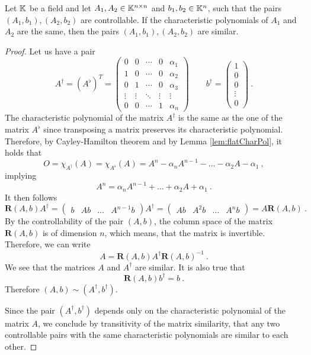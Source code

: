 \begin{lemma}
\label{lem:simCont}
    Let $\mathbb{K}$ be a field and let $A_1,A_2\in\mathbb{K}^{n\times n}$ and $b_1,b_2\in\mathbb{K}^n$, such that the pairs $(A_1,b_1),(A_2,b_2)$ are controllable. If the characteristic polynomials of $A_1$ and $A_2$ are the same, then the pairs $(A_1,b_1),(A_2,b_2)$ are similar.
\end{lemma}

\begin{proof}
    Let us have a pair
    $$A^\dagger=(A^\flat)^T=
    \begin{pmatrix}
        0 & 0 & \cdots & 0 & \alpha_1 \\
        1 & 0 & \cdots & 0 & \alpha_2 \\
        0 & 1 & \cdots & 0 & \alpha_3 \\
        \vdots & \vdots & \ddots & \vdots & \vdots \\
        0 & 0 & \cdots & 1 & \alpha_n
    \end{pmatrix}\qquad
    b^\dagger=
    \begin{pmatrix}
        1 \\ 0 \\ 0 \\ \vdots \\ 0
    \end{pmatrix}\ .$$
    The characteristic polynomial of the matrix $A^\dagger$ is the same as the one of the matrix $A^\flat$ since transposing a matrix preserves its characteristic polynomial. Therefore, by Cayley-Hamilton theorem and by Lemma \ref{lem:flatCharPol}, it holds that
    $$O=\chi_{A^\dagger}(A)=\chi_{A^\flat}(A)=A^n-\alpha_nA^{n-1}-\ldots-\alpha_2A-\alpha_1\ ,$$
    implying
    $$A^n=\alpha_nA^{n-1}+\ldots+\alpha_2A+\alpha_1\ .$$
    It then follows 
    $$\mathbf{R}(A,b)A^\dagger=
        \begin{pmatrix} 
            b & Ab & \ldots & A^{n-1}b
        \end{pmatrix}
    A^\dagger=
        \begin{pmatrix}
            Ab & A^2b & \ldots & A^nb
        \end{pmatrix}
    =A\mathbf{R}(A,b)\ .$$
    By the controllability of the pair $(A,b)$, the column space of the matrix $\mathbf{R}(A,b)$ is of dimension $n$, which means, that the matrix is invertible. Therefore, we can write 
    $$A=\mathbf{R}(A,b)A^\dagger\mathbf{R}(A,b)^{-1}\ .$$
    We see that the matrices $A$ and $A^\dagger$ are similar. It is also true that $$\mathbf{R}(A,b)b^\dagger=b\ .$$ Therefore $(A,b)\sim(A^\dagger,b^\dagger)$.

    Since the pair $(A^\dagger,b^\dagger)$ depends only on the characteristic polynomial of the matrix $A$, we conclude by transitivity of the matrix similarity, that any two controllable pairs with the same characteristic polynomials are similar to each other.
\end{proof}


